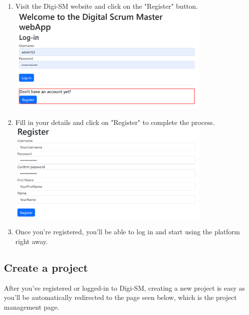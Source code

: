 \documentclass{article}
\begin{document}
\begin{enumerate}
    \item Visit the Digi-SM website and click on the "Register" button.\\
    \includegraphics[width=10cm]{registering.png}
    \newpage
    \item Fill in your details and click on "Register" to complete the process.\\
    \includegraphics[width=10cm]{registerInfo.png}
    \item Once you're registered, you'll be able to log in and start using the platform right away.
\end{enumerate}



\subsection{Create a project}

After you've registered or logged-in to Digi-SM, creating a new project is easy as you'll be automatically redirected to the page seen below, which is the project management page.\\
\end{document}
